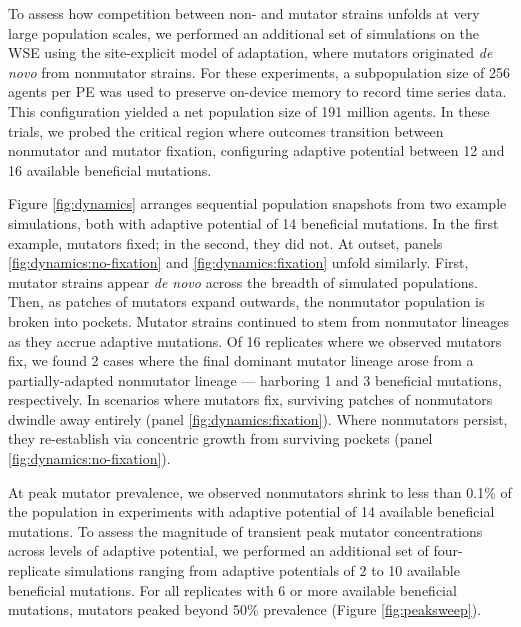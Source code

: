 To assess how competition between non- and mutator strains unfolds at very large population scales, we performed an additional set of simulations on the WSE using the site-explicit model of adaptation, where mutators originated \textit{de novo} from nonmutator strains.
For these experiments, a subpopulation size of 256 agents per PE was used to preserve on-device memory to record time series data.
This configuration yielded a net population size of 191 million agents.
In these trials, we probed the critical region where outcomes transition between nonmutator and mutator fixation, configuring adaptive potential between 12 and 16 available beneficial mutations.



Figure \ref{fig:dynamics} arranges sequential population snapshots from two example simulations, both with adaptive potential of 14 beneficial mutations.
In the first example, mutators fixed; in the second, they did not.
At outset, panels \ref{fig:dynamics:no-fixation} and \ref{fig:dynamics:fixation} unfold similarly.
First, mutator strains appear \textit{de novo} across the breadth of simulated populations.
Then, as patches of mutators expand outwards, the nonmutator population is broken into pockets.
Mutator strains continued to stem from nonmutator lineages as they accrue adaptive mutations.
Of 16 replicates where we observed mutators fix, we found 2 cases where the final dominant mutator lineage arose from a partially-adapted nonmutator lineage --- harboring 1 and 3 beneficial mutations, respectively.
In scenarios where mutators fix, surviving patches of nonmutators dwindle away entirely (panel \ref{fig:dynamics:fixation}).
Where nonmutators persist, they re-establish via concentric growth from surviving pockets (panel \ref{fig:dynamics:no-fixation}).



At peak mutator prevalence, we observed nonmutators shrink to less than 0.1\% of the population in experiments with adaptive potential of 14 available beneficial mutations.
To assess the magnitude of transient peak mutator concentrations across levels of adaptive potential, we performed an additional set of four-replicate simulations ranging from adaptive potentials of 2 to 10 available beneficial mutations.
For all replicates with 6 or more available beneficial mutations, mutators peaked beyond 50\% prevalence (Figure \ref{fig:peaksweep}).

